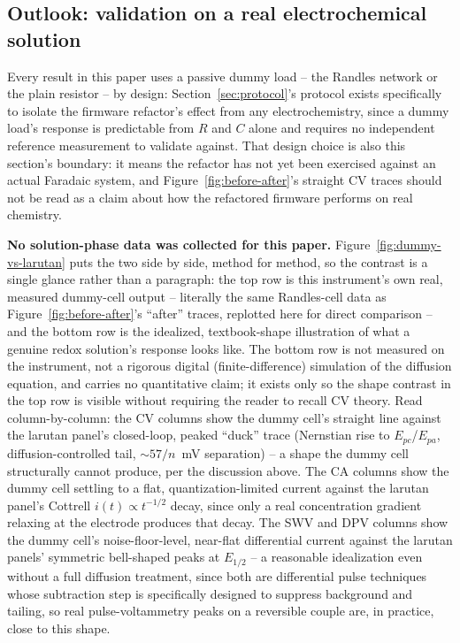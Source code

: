 \subsection{Outlook: validation on a real electrochemical solution}
\label{sec:outlook-real-solution}
Every result in this paper uses a passive dummy load -- the Randles
network or the plain resistor -- by design: Section~\ref{sec:protocol}'s
protocol exists specifically to isolate the firmware refactor's effect from
any electrochemistry, since a dummy load's response is predictable from
$R$ and $C$ alone and requires no independent reference measurement to
validate against. That design choice is also this section's boundary: it
means the refactor has not yet been exercised against an actual
Faradaic system, and Figure~\ref{fig:before-after}'s straight CV traces
should not be read as a claim about how the refactored firmware performs
on real chemistry.

\textbf{No solution-phase data was collected for this paper.}
Figure~\ref{fig:dummy-vs-larutan} puts the two side by side, method for
method, so the contrast is a single glance rather than a paragraph: the
top row is this instrument's own real, measured dummy-cell output --
literally the same Randles-cell data as
Figure~\ref{fig:before-after}'s ``after'' traces, replotted here for direct
comparison -- and the bottom row is the idealized, textbook-shape
illustration of what a genuine redox solution's response looks like. The
bottom row is not measured on the instrument, not a rigorous digital
(finite-difference) simulation of the diffusion equation, and carries no
quantitative claim; it exists only so the shape contrast in the top row is
visible without requiring the reader to recall CV theory. Read
column-by-column: the CV columns show the dummy cell's straight line
against the larutan panel's closed-loop, peaked ``duck'' trace (Nernstian
rise to $E_{pc}$/$E_{pa}$, diffusion-controlled tail, $\sim\!57/n$~mV
separation) -- a shape the dummy cell structurally cannot produce, per the
discussion above. The CA columns show the dummy cell settling to a flat,
quantization-limited current against the larutan panel's Cottrell
$i(t)\propto t^{-1/2}$ decay, since only a real concentration gradient
relaxing at the electrode produces that decay. The SWV and DPV columns show
the dummy cell's noise-floor-level, near-flat differential current against
the larutan panels' symmetric bell-shaped peaks at $E_{1/2}$ -- a reasonable
idealization even without a full diffusion treatment, since both are
differential pulse techniques whose subtraction step is specifically
designed to suppress background and tailing, so real pulse-voltammetry
peaks on a reversible couple are, in practice, close to this shape.

